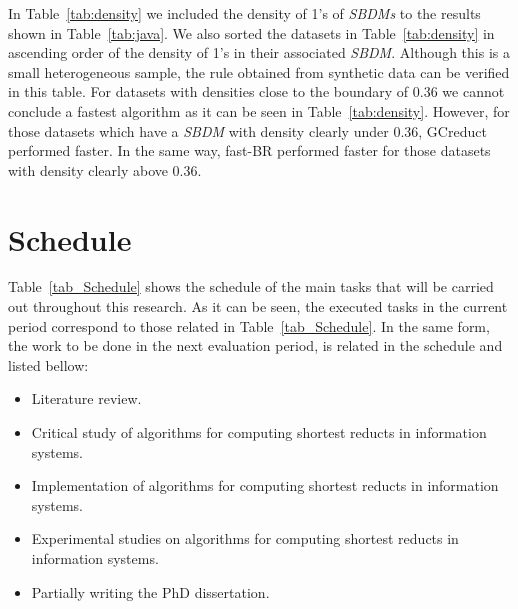 \documentclass[authoryear,11pt]{elsarticle}
\begin{document}
  In Table~\ref{tab:density} we included the density of 1's of \textit{SBDMs} to the results shown in Table~\ref{tab:java}. We also sorted the datasets in Table~\ref{tab:density} in ascending order of the density of 1's in their associated \textit{SBDM}. Although this is a small heterogeneous sample, the rule obtained from synthetic data can be verified in this table. For datasets with densities close to the boundary of 0.36 we cannot conclude a fastest algorithm as it can be seen in Table~\ref{tab:density}. However, for those datasets which have a \textit{SBDM} with density clearly under 0.36, GCreduct performed faster. In the same way, fast-BR performed faster for those datasets with density clearly above 0.36.

\section{Schedule}\label{sec_schedule}
  Table~\ref{tab_Schedule} shows the schedule of the main tasks that will be carried out throughout this research. As it can be seen, the executed tasks in the current period correspond to those related in Table~\ref{tab_Schedule}. In the same form, the work to be done in the next evaluation period, is related in the schedule and listed bellow:
  
  \begin{itemize}
  	\itemsep0em 
  	\item Literature review.
  	\item Critical study of algorithms for computing shortest reducts in information systems.
  	\item Implementation of algorithms for computing shortest reducts in information systems.
  	\item Experimental studies on algorithms for computing shortest reducts in information systems.
  	\item Partially writing the PhD dissertation.
  \end{itemize}
  
\end{document}

